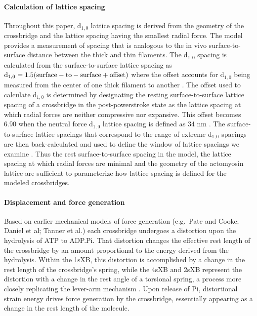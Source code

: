 \documentclass[]{article}
\begin{document}


\paragraph{Calculation of lattice spacing} %
Throughout this paper, d$_{1,0}$ lattice spacing is derived from the geometry of the crossbridge and the lattice spacing having the smallest radial force. 
The model provides a measurement of spacing that is analogous to the in vivo surface-to-surface distance between the thick and thin filaments.
The d$_{1,0}$ spacing is calculated from the surface-to-surface lattice spacing as $\rm{d}_{1,0} = 1.5 (surface-to-surface + offset)$ where the offset accounts for d$_{1,0}$ being measured from the center of one thick filament to another \citep{Millman1998}.
The offset used to calculate d$_{1,0}$ is determined by designating the resting surface-to-surface lattice spacing of a crossbridge in the post-powerstroke state as the lattice spacing at which radial forces are neither compressive nor expansive.  
This offset becomes 6.90 when the neutral force d$_{1,0}$ lattice spacing is defined as 34 nm \citep{Brenner1991}. 
The surface-to-surface lattice spacings that correspond to the range of extreme d$_{1,0}$ spacings are then back-calculated and used to define the window of lattice spacings we examine \citep{Millman1998}. %
Thus the rest surface-to-surface spacing in the model, the lattice spacing at which radial forces are minimal and the geometry of the actomyosin lattice are sufficient to parameterize how lattice spacing is defined for the modeled crossbridges. 

\paragraph{Displacement and force generation} %
Based on earlier mechanical models of force generation (e.g.\ Pate and Cooke; Daniel et al; Tanner et al.) each crossbridge undergoes a distortion upon the hydrolysis of ATP to ADP.Pi.  
That distortion changes the effective rest length of the crossbridge by an amount proportional to the energy derived from the hydrolysis.  
Within the 1sXB, this distortion is accomplished by a change in the rest length of the crossbridge's spring, while the 4sXB and 2sXB represent the distortion with a change in the rest angle of a torsional spring, a process more closely replicating the lever-arm mechanism \citep{Reedy2000}.
Upon release of Pi, distortional strain energy drives force generation by the crossbridge, essentially appearing as a change in the rest length of the molecule.
\end{document}
